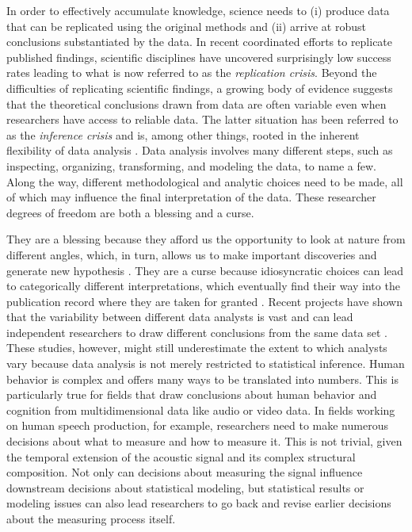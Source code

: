 \documentclass[Review,times,sageh]{sagej}
\begin{document}
In order to effectively accumulate knowledge, science needs to (i) produce data that can be replicated using the original methods and (ii) arrive at robust conclusions substantiated by the data.
In recent coordinated efforts to replicate published findings, scientific disciplines have uncovered surprisingly low success rates \citep[e.g.,][]{open2015estimating, camerer2018evaluating} leading to what is now referred to as the \emph{replication crisis}.
Beyond the difficulties of replicating scientific findings, a growing body of evidence suggests that the theoretical conclusions drawn from data are often variable even when researchers have access to reliable data.
The latter situation has been referred to as the \emph{inference crisis} \citep{rotello2015more, starns2019assessing} and is, among other things, rooted in the inherent flexibility of data analysis \citep[often referred to as researcher degrees of freedom:][]{simmons2011false, gelman2014statistical}.
Data analysis involves many different steps, such as inspecting, organizing, transforming, and modeling the data, to name a few.
Along the way, different methodological and analytic choices need to be made, all of which may influence the final interpretation of the data.
These researcher degrees of freedom are both a blessing and a curse.

They are a blessing because they afford us the opportunity to look at nature from different angles, which, in turn, allows us to make important discoveries and generate new hypothesis \citep[e.g.,][]{box1976science, tukey1977exploratory, de2014thought}.
They are a curse because idiosyncratic choices can lead to categorically different interpretations, which eventually find their way into the publication record where they are taken for granted \citep{simmons2011false}.
Recent projects have shown that the variability between different data analysts is vast and can lead independent researchers to draw different conclusions from the same data set \citep[e.g.,][]{silberzahn2018many, starns2019assessing, botvinik2020variability}.
These studies, however, might still underestimate the extent to which analysts vary because data analysis is not merely restricted to statistical inference.
Human behavior is complex and offers many ways to be translated into numbers.
This is particularly true for fields that draw conclusions about human behavior and cognition from multidimensional data like audio or video data.
In fields working on human speech production, for example, researchers need to make numerous decisions about what to measure and how to measure it.
This is not trivial, given the temporal extension of the acoustic signal and its complex structural composition.
Not only can decisions about measuring the signal influence downstream decisions about statistical modeling, but statistical results or modeling issues can also lead researchers to go back and revise earlier decisions about the measuring process itself.
\end{document}
